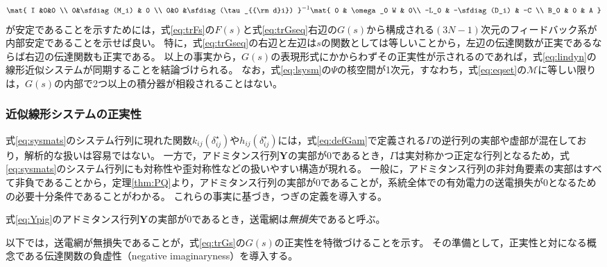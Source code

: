 \documentclass[tombow,dvipdfmx]{corona-a5}
\begin{document}
\begin{align*}
\mat{
I &0&0 \\
0&\sfdiag(M_i) & 0 \\
0&0 &\sfdiag(\tau_{{\rm d}i}) 
}^{-1}
\mat{
 0 & \omega_0 W & 0\\
  -L_0 & -\sfdiag(D_i) & -C \\
 B_0 & 0 & A
 }
\end{align*}
が安定であることを示すためには，式\ref{eq:trFs}の$F(s)$と式\ref{eq:trGseq}右辺の$G(s)$から構成される$(3N-1)$次元のフィードバック系が内部安定であることを示せば良い。
特に，式\ref{eq:trGseq}の右辺と左辺は$s$の関数としては等しいことから，左辺の伝達関数が正実であるならば右辺の伝達関数も正実である。
以上の事実から，$G(s)$の表現形式にかからわずその正実性が示されるのであれば，式\ref{eq:lindyn}の線形近似システムが同期することを結論づけられる。
なお，式\ref{eq:lsysm}の$\Psi$の核空間が1次元，すなわち，式\ref{eq:eqset}の$\mathcal{M}$に等しい限りは，$G(s)$の内部で2つ以上の積分器が相殺されることはない。

\subsubsection{近似線形システムの正実性}

式\ref{eq:sysmats}のシステム行列に現れた関数$k_{ij}(\delta_{ij}^{\star})$や$h_{ij}(\delta_{ij}^{\star})$には，式\ref{eq:defGam}で定義される$\bm{\mathit{\Gamma}}$の逆行列の実部や虚部が混在しており，解析的な扱いは容易ではない。
一方で，アドミタンス行列$\bm{Y}$の実部が0であるとき，$\bm{\mathit{\Gamma}}$は実対称かつ正定な行列となるため，式\ref{eq:sysmats}のシステム行列にも対称性や歪対称性などの扱いやすい構造が現れる。
一般に，アドミタンス行列の非対角要素の実部はすべて非負であることから，定理\ref{thm:PQ}より，アドミタンス行列の実部が0であることが，系統全体での有効電力の送電損失が0となるための必要十分条件であることがわかる。
これらの事実に基づき，つぎの定義を導入する。

\begin{定義}\label{def:lless}
式\ref{eq:Ypig}のアドミタンス行列$\bm{Y}$の実部が0であるとき，送電網は\emph{無損失}であると呼ぶ。
\end{定義}

以下では，送電網が無損失であることが，式\ref{eq:trGs}の$G(s)$の正実性を特徴づけることを示す。
その準備として，正実性と対になる概念である伝達関数の負虚性（negative imaginaryness）を導入する\cite{petersen2010feedback,xiong2010negative}。
\end{document}

